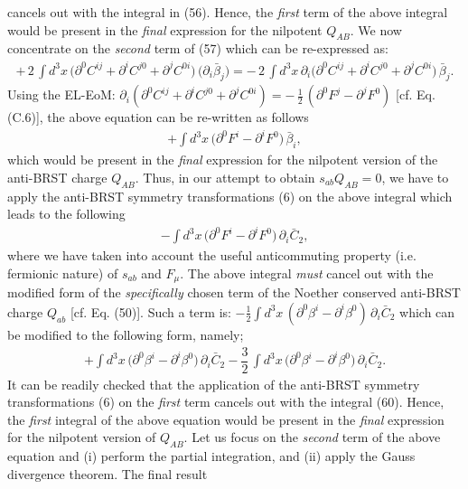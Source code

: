 \documentclass[12pt]{article}
\begin{document}
cancels out with the integral in (56). Hence, the {\it first}  term of the above integral would be present in the {\it final} 
expression for the nilpotent $Q_{AB}$. We now concentrate on the {\it second} term of (57) which can be re-expressed as:
\begin{eqnarray}\label{58}
+ \,2\,  
\int d^3 x\,\big (\partial^0 C^{ij} + \partial^i C^{j0}  + \partial^j C^{0i} \big )\, 
\big (\partial_i \bar \beta_j \big ) = -\, 2\, \int d^3 x\,\partial _i \big (\partial^0 C^{ij} + \partial^i C^{j0}  + \partial^j C^{0i} \big )\, \bar \beta_j.
\end{eqnarray}
Using the EL-EoM: $\partial_i (\partial^0 C^{ij} + \partial^i C^{j0}  + \partial^j C^{0i}) = -\, \frac{1}{2}\, (\partial^0 F^j - \partial^j F^0)$  [cf. Eq. (C.6)], 
the above equation can be re-written as follows
\begin{eqnarray}\label{59}
+ \int d^3 x\,\big (\partial^0 F^i - \partial^i F^0\big )\, \bar \beta_i,
\end{eqnarray}
which would be present in the {\it final} expression for the nilpotent version of the anti-BRST charge $Q_{AB}$. Thus, in our attempt to obtain $s_{ab} Q_{AB} = 0$,
we have to apply the anti-BRST symmetry transformations (6) on the above integral which leads to the following
\begin{eqnarray}\label{60}
- \int d^3 x\,\big (\partial^0 F^i - \partial^i F^0 \big )\, \partial_i \bar C_2,
\end{eqnarray}
where we have taken into account the useful 
anticommuting property (i.e. fermionic nature) of $s_{ab}$ and $F_\mu$. The above integral {\it must} cancel out with the modified
form of the {\it specifically} chosen term of the Noether conserved anti-BRST charge $Q_{ab}$ [cf. Eq. (50)]. Such a term is: $ - \frac{1}{2}\int d^3 x\,
(\partial^0 \beta^i - \partial^i \beta^0)\, \partial_i \bar C_2 $ which can be modified to the following form, namely;
\begin{eqnarray}\label{61}
+ \int d^3 x\,\big (\partial^0 \beta^i - \partial^i \beta^0\big )\, \partial_i \bar C_2 - \dfrac{3}{2}\,
\int d^3 x\,\big (\partial^0 \beta^i - \partial^i \beta^0\big )\, \partial_i \bar C_2.
\end{eqnarray}
It can be readily checked that the application of the anti-BRST symmetry transformations (6) on the {\it first} term cancels out with the integral (60).
Hence, the {\it first} integral of the above equation would be present in the {\it final} expression for the nilpotent version of $Q_{AB}$. Let us focus on the
{\it second} term of the above equation and (i) perform the partial integration, and (ii) apply the Gauss divergence theorem. The final result
\end{document}
